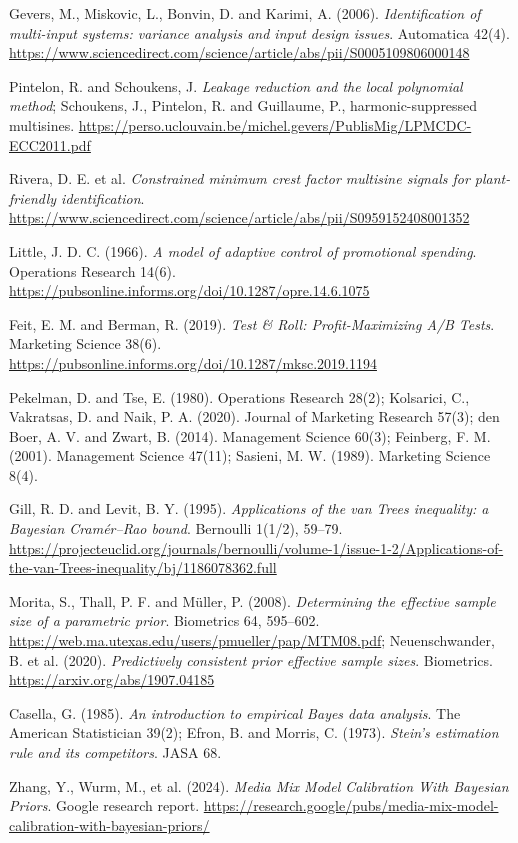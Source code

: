 \begin{enumerate}[label={[\arabic*]},leftmargin=2.5em]
\item Gevers, M., Miskovic, L., Bonvin, D. and Karimi, A. (2006). \emph{Identification of multi-input systems: variance analysis and input design issues}. Automatica 42(4). \url{https://www.sciencedirect.com/science/article/abs/pii/S0005109806000148}
\item Pintelon, R. and Schoukens, J. \emph{Leakage reduction and the local polynomial method}; Schoukens, J., Pintelon, R. and Guillaume, P., harmonic-suppressed multisines. \url{https://perso.uclouvain.be/michel.gevers/PublisMig/LPMCDC-ECC2011.pdf}
\item Rivera, D. E. et al. \emph{Constrained minimum crest factor multisine signals for plant-friendly identification}. \url{https://www.sciencedirect.com/science/article/abs/pii/S0959152408001352}
\item Little, J. D. C. (1966). \emph{A model of adaptive control of promotional spending}. Operations Research 14(6). \url{https://pubsonline.informs.org/doi/10.1287/opre.14.6.1075}
\item Feit, E. M. and Berman, R. (2019). \emph{Test \& Roll: Profit-Maximizing A/B Tests}. Marketing Science 38(6). \url{https://pubsonline.informs.org/doi/10.1287/mksc.2019.1194}
\item Pekelman, D. and Tse, E. (1980). Operations Research 28(2); Kolsarici, C., Vakratsas, D. and Naik, P. A. (2020). Journal of Marketing Research 57(3); den Boer, A. V. and Zwart, B. (2014). Management Science 60(3); Feinberg, F. M. (2001). Management Science 47(11); Sasieni, M. W. (1989). Marketing Science 8(4).
\item Gill, R. D. and Levit, B. Y. (1995). \emph{Applications of the van Trees inequality: a Bayesian Cram\'er--Rao bound}. Bernoulli 1(1/2), 59--79. \url{https://projecteuclid.org/journals/bernoulli/volume-1/issue-1-2/Applications-of-the-van-Trees-inequality/bj/1186078362.full}
\item Morita, S., Thall, P. F. and M\"uller, P. (2008). \emph{Determining the effective sample size of a parametric prior}. Biometrics 64, 595--602. \url{https://web.ma.utexas.edu/users/pmueller/pap/MTM08.pdf}; Neuenschwander, B. et al. (2020). \emph{Predictively consistent prior effective sample sizes}. Biometrics. \url{https://arxiv.org/abs/1907.04185}
\item Casella, G. (1985). \emph{An introduction to empirical Bayes data analysis}. The American Statistician 39(2); Efron, B. and Morris, C. (1973). \emph{Stein's estimation rule and its competitors}. JASA 68.
\item Zhang, Y., Wurm, M., et al. (2024). \emph{Media Mix Model Calibration With Bayesian Priors}. Google research report. \url{https://research.google/pubs/media-mix-model-calibration-with-bayesian-priors/}

\end{enumerate}
